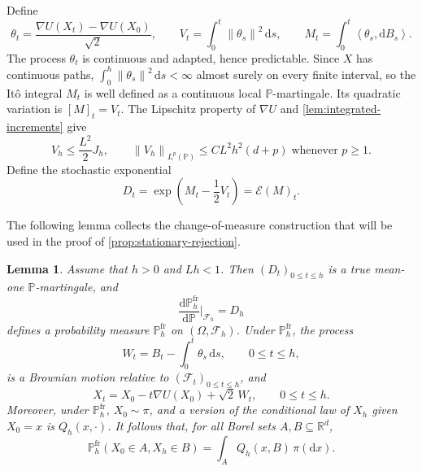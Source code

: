 \documentclass[11pt]{article}
\newtheorem{lemma}[lemma]{Lemma}
\newcommand{\R}{\mathbb R}
\newcommand{\ip}[2]{\left\langle #1,#2\right\rangle}
\newcommand{\norm}[1]{\left\lVert #1\right\rVert}
\newcommand{\1}{\mathbf 1}
\newcommand{\df}{\mathrm{d}}
\begin{document}
	Define
	\begin{equation*}
		\theta_t=
		\frac{\nabla U(X_t)-\nabla U(X_0)}{\sqrt{2}},
		\qquad
		V_t=\int_0^t\norm{\theta_s}^2\,\df s,
		\qquad
		M_t=\int_0^t\ip{\theta_s}{\df B_s}.
	\end{equation*}
	The process \(\theta_t\) is continuous and adapted, hence predictable.  Since
	\(X\) has continuous paths, \(\int_0^h\norm{\theta_s}^2\,\df s<\infty\) almost
	surely on every finite interval, so the It\^o integral $M_t$ is well defined as a
	continuous local \(\mathbb P\)-martingale.  Its quadratic variation is
	\([M]_t=V_t\).  The Lipschitz property of \(\nabla U\) and
	\cref{lem:integrated-increments} give
	\begin{equation}\label{eq:V-J}
		V_h
		\leq
		\frac{L^2}{2}J_h,
		\qquad
		\norm{V_h}_{L^p(\mathbb P)}
		\leq
		C L^2h^2(d+p)
		\; \text{whenever }p\geq1.
	\end{equation}
	Define the stochastic exponential
	\begin{equation*}
		D_t=\exp\left( M_t-\frac12V_t\right) = \mathcal E(M)_t.
	\end{equation*}
	
	The following lemma collects the change-of-measure construction that will be used in the proof of
	\cref{prop:stationary-rejection}.
	
	\begin{lemma}
		\label{lem:frozen-endpoint-law}
		Assume that \(h>0\) and \(Lh<1\).  Then
		\((D_t)_{0\leq t\leq h}\) is a true mean-one \(\mathbb P\)-martingale, and
		\begin{equation}\label{eq:frozen-measure-definition}
			\frac{\df\mathbb P_h^{\mathrm{fr}}}{\df\mathbb P}
			\bigg|_{\mathcal F_h}=D_h
		\end{equation}
		defines a probability measure \(\mathbb P_h^{\mathrm{fr}}\) on \((\Omega,\mathcal F_h)\).  Under
		\(\mathbb P_h^{\mathrm{fr}}\), the process
		\[
		W_t=B_t-\int_0^t\theta_s\,\df s,
		\qquad 0\leq t\leq h,
		\]
		is a Brownian motion relative to
		\((\mathcal F_t)_{0\leq t\leq h}\), and
		\begin{equation}\label{eq:frozen-path}
			X_t=X_0-t\nabla U(X_0)+\sqrt{2}\,W_t,
			\qquad 0\leq t\leq h.
		\end{equation}
		Moreover, under \(\mathbb P_h^{\mathrm{fr}}\), \(X_0\sim\pi\), and a version
		of the conditional law of \(X_h\) given \(X_0=x\) is \(Q_h(x,\cdot)\).
		It follows that, for all Borel sets \(A,B\subseteq\R^d\),
		\begin{equation}\label{eq:frozen-endpoint-law}
			\mathbb P_h^{\mathrm{fr}}(X_0\in A,X_h\in B)
			=\int_A Q_h(x,B)\,\pi(\df x).
		\end{equation}
	\end{lemma}
	
\end{document}
